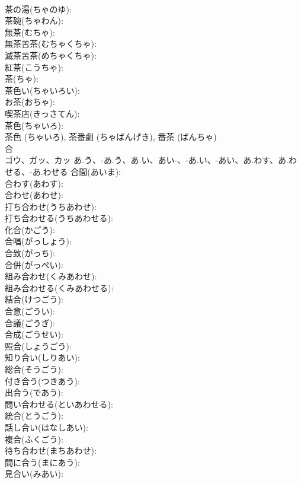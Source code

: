 \documentclass[8pt]{extreport}
\begin{document}
\begin{CJK}{UTF8}{min}
\\	茶の湯(ちゃのゆ): 
\\	茶碗(ちゃわん): 
\\	無茶(むちゃ): 
\\	無茶苦茶(むちゃくちゃ): 
\\	滅茶苦茶(めちゃくちゃ): 
\\	紅茶(こうちゃ): 
\\	茶(ちゃ): 
\\	茶色い(ちゃいろい): 
\\	お茶(おちゃ): 
\\	喫茶店(きっさてん): 
\\	茶色(ちゃいろ): 
\\	茶色 (ちゃいろ), 茶番劇 (ちゃばんげき), 番茶 (ばんちゃ)
\\	合			
\\	ゴウ、ガッ、カッ	あ.う、-あ.う、あ.い、あい-、-あ.い、-あい、あ.わす、あ.わせる、-あ.わせる	合間(あいま): 
\\	合わす(あわす): 
\\	合わせ(あわせ): 
\\	打ち合わせ(うちあわせ): 
\\	打ち合わせる(うちあわせる): 
\\	化合(かごう): 
\\	合唱(がっしょう): 
\\	合致(がっち): 
\\	合併(がっぺい): 
\\	組み合わせ(くみあわせ): 
\\	組み合わせる(くみあわせる): 
\\	結合(けつごう): 
\\	合意(ごうい): 
\\	合議(ごうぎ): 
\\	合成(ごうせい): 
\\	照合(しょうごう): 
\\	知り合い(しりあい): 
\\	総合(そうごう): 
\\	付き合う(つきあう): 
\\	出合う(であう): 
\\	問い合わせる(といあわせる): 
\\	統合(とうごう): 
\\	話し合い(はなしあい): 
\\	複合(ふくごう): 
\\	待ち合わせ(まちあわせ): 
\\	間に合う(まにあう): 
\\	見合い(みあい): 

\end{CJK}
\end{document}
